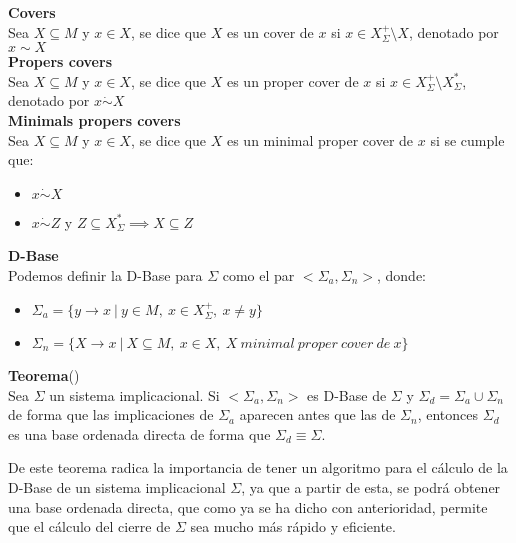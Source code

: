 \textbf{Covers}\\
Sea \(X \subseteq M\) y \(x \in X\), se dice que \(X\) es un cover de \(x\) si \(x \in X^+_{\Sigma} \setminus X\), denotado por \(x \sim X\)\\

\textbf{Propers covers} \\
Sea \(X \subseteq M\) y \(x \in X\), se dice que \(X\) es un proper cover de \(x\) si \(x \in X^+_{\Sigma} \setminus X^*_{\Sigma}\), denotado por \(x \dot\sim X\)\\

\textbf{Minimals propers covers}\\
Sea \(X \subseteq M\) y \(x \in X\), se dice que \(X\) es un minimal proper cover de \(x\) si se cumple que:
\begin{itemize}
    \item \(x \dot\sim X\)
    \item \(x \dot\sim Z\) y \(Z \subseteq X^*_{\Sigma} \implies X \subseteq Z\)\\
\end{itemize}

\textbf{D-Base}\\
Podemos definir la D-Base para \(\Sigma\) como el par \(<\Sigma_a, \Sigma_n>\), donde:

\begin{itemize}
    \item \(\Sigma_a = \{y \to x \ | \ y \in M, \ x \in X^+_{\Sigma}, \ x \neq y \} \)
    \item \(\Sigma_n = \{X \to x \ | \ X \subseteq M, \ x \in X, \ X \ minimal \ proper \ cover \ de \ x\} \)

\end{itemize}

\textbf{Teorema}(\cite{Adaricheva})\\
Sea \(\Sigma\) un sistema implicacional. Si \(<\Sigma_a, \Sigma_n>\) es D-Base de \(\Sigma\) y \(\Sigma_d = \Sigma_a\cup \Sigma_n\) de forma que las implicaciones de \(\Sigma_a\) aparecen antes que las de \(\Sigma_n\), entonces \(\Sigma_d\) es una base ordenada directa de forma que \(\Sigma_d \equiv \Sigma\).

De este teorema radica la importancia de tener un algoritmo para el c\'alculo de la D-Base de un sistema implicacional \(\Sigma\), ya que a partir de esta, se podr\'a obtener una base ordenada directa, que como ya se ha dicho con anterioridad, permite que el c\'alculo del cierre de \(\Sigma\) sea mucho m\'as r\'apido y eficiente.\\


